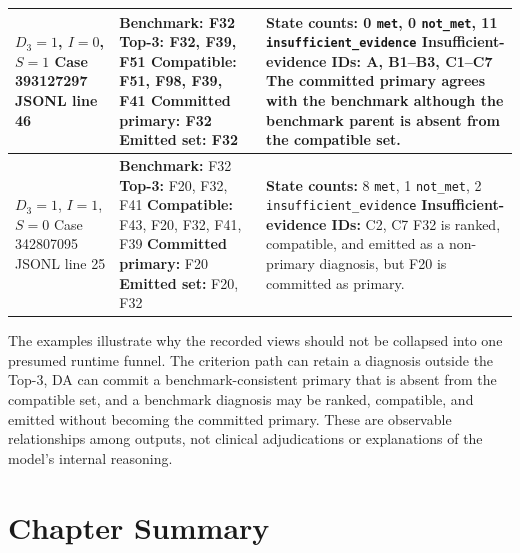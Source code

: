 \begin{longtable}{|>{\raggedright\arraybackslash}p{2.6cm}|>{\raggedright\arraybackslash}p{5.0cm}|>{\raggedright\arraybackslash}p{6.2cm}|}
$D_3=1$, $I=0$, $S=1$\newline
Case 393127297\newline
JSONL line 46 &
\textbf{Benchmark:} F32\newline
\textbf{Top-3:} F32, F39, F51\newline
\textbf{Compatible:} F51, F98, F39, F41\newline
\textbf{Committed primary:} F32\newline
\textbf{Emitted set:} F32 &
\textbf{State counts:} 0 \texttt{met}, 0 \texttt{not\_met}, 11 \texttt{insufficient\_evidence}\newline
\textbf{Insufficient-evidence IDs:} A, B1--B3, C1--C7\newline
The committed primary agrees with the benchmark although the benchmark parent is absent from the compatible set.\\
\hline

$D_3=1$, $I=1$, $S=0$\newline
Case 342807095\newline
JSONL line 25 &
\textbf{Benchmark:} F32\newline
\textbf{Top-3:} F20, F32, F41\newline
\textbf{Compatible:} F43, F20, F32, F41, F39\newline
\textbf{Committed primary:} F20\newline
\textbf{Emitted set:} F20, F32 &
\textbf{State counts:} 8 \texttt{met}, 1 \texttt{not\_met}, 2 \texttt{insufficient\_evidence}\newline
\textbf{Insufficient-evidence IDs:} C2, C7\newline
F32 is ranked, compatible, and emitted as a non-primary diagnosis, but F20 is committed as primary.\\

\end{longtable}
\renewcommand{\arraystretch}{1.0}
\endgroup

The examples illustrate why the recorded views should not be collapsed into one presumed runtime funnel. The criterion path can retain a diagnosis outside the Top-3, DA can commit a benchmark-consistent primary that is absent from the compatible set, and a benchmark diagnosis may be ranked, compatible, and emitted without becoming the committed primary. These are observable relationships among outputs, not clinical adjudications or explanations of the model's internal reasoning.

\section{Chapter Summary}
\label{sec:ch8-completeness-limitations}

